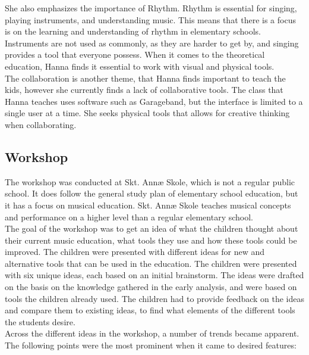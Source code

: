She also emphasizes the importance of Rhythm. Rhythm is essential for singing, playing instruments, and understanding music. This means that there is a focus is on the learning and understanding of rhythm in elementary schools. Instruments are not used as commonly, as they are harder to get by, and singing provides a tool that everyone possess. When it comes to the theoretical education, Hanna finds it essential to work with visual and physical tools. \\

The collaboration is another theme, that Hanna finds important to teach the kids, however she currently finds a lack of collaborative tools. The class that Hanna teaches uses software such as Garageband, but the interface is limited to a single user at a time. She seeks physical tools that allows for creative thinking when collaborating.\\

\subsection{Workshop}\label{sec:workshop}
The workshop was conducted at Skt. Annæ Skole, which is not a regular public school. It does follow the general study plan of elementary school education, but it has a focus on musical education. Skt. Annæ Skole teaches musical concepts and performance on a higher level than a regular elementary school.\\

The goal of the workshop was to get an idea of what the children thought about their current music education, what tools they use and how these tools could be improved. The children were presented with different ideas for new and alternative tools that can be used in the education. The children were presented with six unique ideas, each based on an initial brainstorm. The ideas were drafted on the basis on the knowledge gathered in the early analysis, and were based on tools the children already used. The children had to provide feedback on the ideas and compare them to existing ideas, to find what elements of the different tools the students desire.\\

Across the different ideas in the workshop, a number of trends became apparent. The following points were the most prominent when it came to desired features:\\


